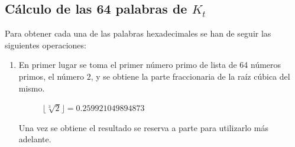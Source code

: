 \documentclass{article}
\begin{document}
    \subsection{Cálculo de las 64 palabras de $K_{t}$}
        Para obtener cada una de las palabras hexadecimales se han de seguir las siguientes operaciones:
        \begin{enumerate}
            \item En primer lugar se toma el primer número primo de lista de 64 números primos, el número $2$, y se obtiene la parte fraccionaria de la raíz cúbica del mismo.
                \begin{figure}[H]
                \centering
                    $\lfloor \sqrt[3]{2} \rfloor = 0.259921049894873$
                \end{figure}
                Una vez se obtiene el resultado se reserva a parte para utilizarlo más adelante.
            

\end{enumerate}
\end{document}
